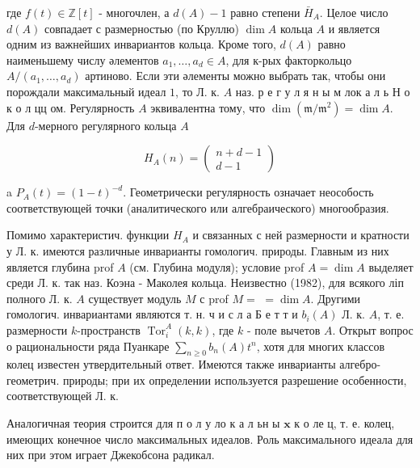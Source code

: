 \documentclass[10pt]{article}
\begin{document}
где $f(t) \in \mathbb{Z}[t]$ - многочлен, а $d(A)-1$ равно степени $\bar{H}_{A}$. Целое число $d(A)$ совпадает с размерностью (по Круллю) $\operatorname{dim} A$ кольца $A$ и является одним из важнейших инвариантов кольца. Кроме того, $d(A)$ равно наименьшему числу әлементов $a_{1}, \ldots, a_{d} \in A$, для к-рых факторкольцо $A /\left(a_{1}, \ldots, a_{d}\right)$ артиново. Если эти әлементы можно выбрать так, чтобы они порождали максимальный идеал $\mathfrak{1}$, то Л. к. $A$ наз. р е г у л я н ы м лок а л ь Н $о$ к о л цц ом. Регулярность $A$ эквивалентна тому, что $\operatorname{dim}\left(\mathfrak{m} / \mathfrak{m}^{2}\right)=\operatorname{dim} A$. Для $d$-мерного регулярного кольца $A$



\[

H_{A}(n)=\left(\begin{array}{c}

n+d-1 \\

d-1

\end{array}\right)

\]



a $P_{A}(t)=(1-t)^{-d}$. Геометрически регулярность означает неособость соответствующей точки (аналитического или алгебраического) многообразия.



Помимо характеристич. функции $H_{A}$ и связанных с ней размерности и кратности у Л. к. имеются различные инварианты гомологич. природы. Главным из них является глубина prof $A$ (см. Глубина модуля); условие prof $A=\operatorname{dim} A$ выделяет среди Л. к. так наз. Коэна - Маколея кольца. Неизвестно (1982), для всякого ліп полного Л. к. $A$ существует модуль $M$ с prof $M=$ $=\operatorname{dim} A$. Другими гомологич. инвариантами являются т. н. ч и с л а Б е т т и $b_{i}(A)$ Л. к. $A$, т. е. размерности $k$-пространств $\operatorname{Tor}_{i}^{A}(k, k)$, где $k$ - поле вычетов $A$. Открыт вопрос о рациональности ряда Пуанкаре $\sum_{n \geqslant 0} b_{n}(A) t^{n}$, хотя для многих классов колец известен утвердительный ответ. Имеются также инварианты алгебро-геометрич. природы; при их определении используется разрешение особенности, соответствующей Л. к.



Аналогичная теория строится для п о л у ло к а л ьн ы $\mathbf{x}$ к о ле ц, т. е. колец, имеющих конечное число максимальных идеалов. Роль максимального идеала для них при этом играет Джекобсона радикал.
\end{document}
